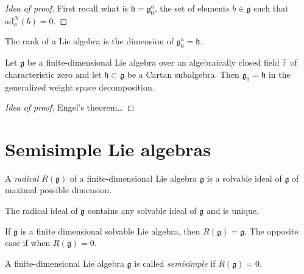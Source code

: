 \begin{proof}[Idea of proof]
First recall what is $\mathfrak{h}=\mathfrak{g}_0^a$, the set of elements
$b\in\mathfrak{g}$ such that $\text{ad}_a^N(b)=0$.
\end{proof}

\begin{remark}
\label{remark-rank-is-dimension-of-that-subalgebra}
The rank of a Lie algebra is the dimension of $\mathfrak{g}_0^a=\mathfrak{h}$.
\end{remark}

\begin{proposition}
\label{proposition-g0-equals-h-for-any-Cartan-subalgebra-h}
Let $\mathfrak{g}$ be a finite-dimensional Lie algebra over
an algebraically closed field $\mathbb{F}$ of characteristic zero
and let $\mathfrak{h}\subset\mathfrak{g}$ be a Cartan subalgebra.
Then $\mathfrak{g}_0=\mathfrak{h}$ in the generalized 
weight space decomposition.
\end{proposition}

\begin{proof}[Idea of proof]
Engel's theorem…
\end{proof}



\section{Semisimple Lie algebras}
\label{section-semisimple-Lie-algebras}

\begin{definition}
\label{definition-radical}
A {\it radical} $R(\mathfrak{g})$ of a finite-dimensional Lie algebra
$\mathfrak{g}$ is a solvable ideal of $\mathfrak{g}$ of maximal possible
dimension.
\end{definition}

\begin{proposition}
\label{proposition-radical-ideal-contains-any-solvable-ideal-and-is-unique}
The radical ideal of $\mathfrak{g}$ contains any solvable ideal of
$\mathfrak{g}$ and is unique.
\end{proposition}

If $\mathfrak{g}$ is a finite dimensional solvable Lie algebra,
then $R(\mathfrak{g})=\mathfrak{g}$. 
The opposite case if when $R(\mathfrak{g})=0$.

\begin{definition}
\label{definition-semisimple-Lie-algebra}
A finite-dimensional Lie algebra $\mathfrak{g}$ is called {\it semisimple} if
$R(\mathfrak{g})=0$.
\end{definition}

